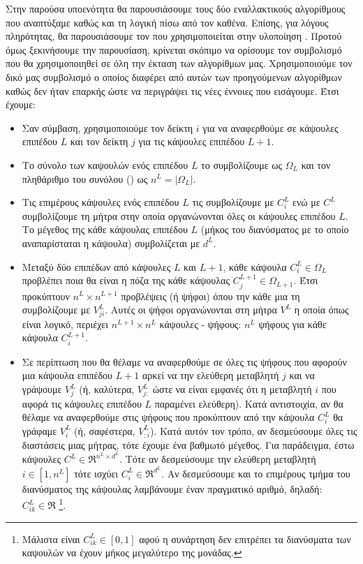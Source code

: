 Στην παρούσα υποενότητα θα παρουσιάσουμε τους δύο εναλλακτικούς αλγορίθμους που αναπτύξαμε καθώς και τη λογική πίσω από τον καθένα. Επίσης, για λόγους πληρότητας, θα παρουσιάσουμε τον  που χρησιμοποιείται στην υλοποίηση \cite{mazzia2021efficient}. Προτού όμως ξεκινήσουμε την παρουσίαση, κρίνεται σκόπιμο να ορίσουμε τον συμβολισμό που θα χρησιμοποιηθεί σε όλη την έκταση των αλγορίθμων μας. Χρησιμοποιούμε τον δικό μας συμβολισμό ο οποίος διαφέρει από αυτών των προηγούμενων αλγορίθμων καθώς δεν ήταν επαρκής ώστε να περιγράψει τις νέες έννοιες που εισάγουμε. Έτσι έχουμε:
\begin{itemize}
  \item Σαν σύμβαση, χρησιμοποιούμε τον δείκτη $i$ για να αναφερθούμε σε κάψουλες επιπέδου $L$ και τον δείκτη $j$ για τις κάψουλες επιπέδου $L+1$.
  \item Το σύνολο των καψουλών ενός επιπέδου $L$ το συμβολίζουμε ως $\Omega_L$ και τον πληθάριθμο του συνόλου () ως $n^L = \left\lvert \Omega_L \right\rvert$.
  \item Τις επιμέρους κάψουλες ενός επιπέδου $L$ τις συμβολίζουμε με $C^L_i$ ενώ με $C^L$ συμβολίζουμε τη μήτρα στην οποία οργανώνονται όλες οι κάψουλες επιπέδου $L$. Το μέγεθος της κάθε κάψουλας επιπέδου $L$ (μήκος του διανύσματος με το οποίο αναπαρίσταται η κάψουλα) συμβολίζεται με $d^L$.
  \item Μεταξύ δύο επιπέδων από κάψουλες $L$ και $L+1$, κάθε κάψουλα $C^L_i \in \Omega_L$ προβλέπει ποια θα είναι η πόζα της κάθε κάψουλας $C^{L+1}_j \in \Omega_{L+1}$. Έτσι προκύπτουν $n^L \times n^{L+1}$ προβλέψεις (ή ψήφοι) όπου την κάθε μια τη συμβολίζουμε με $V_{ji}^L$. Αυτές οι ψήφοι οργανώνονται στη μήτρα $V^L$ η οποία όπως είναι λογικό, περιέχει $n^{L+1} \times n^L$ κάψουλες - ψήφους: $n^L$ ψήφους για κάθε κάψουλα $C^{L+1}_i$.
  \item Σε περίπτωση που θα θέλαμε να αναφερθούμε σε όλες τις ψήφους που αφορούν μια κάψουλα επιπέδου $L+1$ αρκεί να  την ελεύθερη μεταβλητή $j$ και να γράψουμε $V^L_j$ (ή, καλύτερα, $V^L_{j:}$ ώστε να είναι εμφανές ότι η μεταβλητή $i$ που αφορά τις κάψουλες επιπέδου $L$ παραμένει ελεύθερη). Κατά αντιστοιχία, αν θα θέλαμε να αναφερθούμε στις ψήφους που προκύπτουν από την κάψουλα $C^L_i$ θα γράφαμε $V^L_i$ (ή, σαφέστερα, $V^L_{:i}$). Κατά αυτόν τον τρόπο, αν δεσμεύσουμε όλες τις διαστάσεις μιας μήτρας, τότε έχουμε ένα βαθμωτό μέγεθος. Για παράδειγμα, έστω κάψουλες $C^L \in \Re^{n^L \times d^L}$. Τότε αν δεσμεύσουμε την ελεύθερη μεταβλητή $i \in [1, n^L]$ τότε ισχύει $C_i^L \in \Re^{d^L}$. Αν δεσμεύσουμε και το επιμέρους τμήμα του διανύσματος της κάψουλας λαμβάνουμε έναν πραγματικό αριθμό, δηλαδή: $C_{ik}^L \in \Re$ \footnote{Μάλιστα είναι $C_{ik}^L \in [0,1]$ αφού η συνάρτηση  δεν επιτρέπει τα διανύσματα των καψουλών να έχουν μήκος μεγαλύτερο της μονάδας.}.

\end{itemize}

